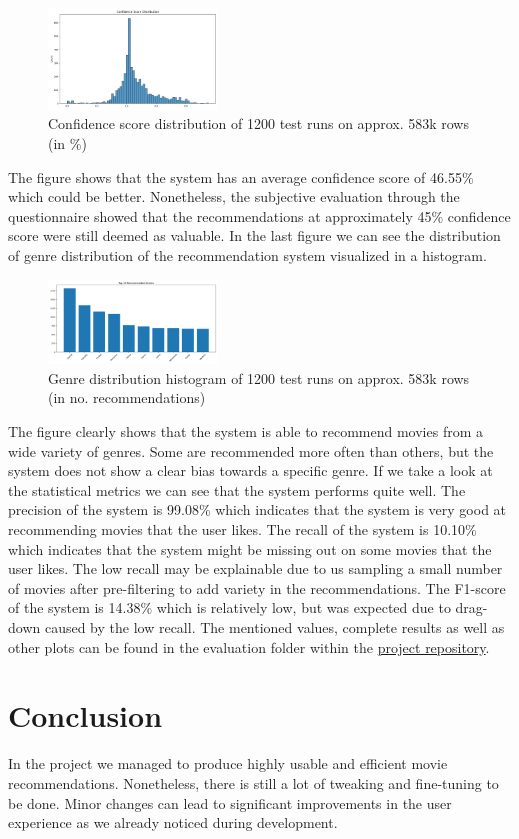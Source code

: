 \documentclass[12pt,a4paper]{article}
\begin{document}
\begin{figure}[H]
  \centering
  \includegraphics[width=0.4\textwidth]{../assets/confidence_dist.png}
  \caption{Confidence score distribution of 1200 test runs on approx. 583k rows (in \%)}
\end{figure}

\noindent The figure shows that the system has an average confidence score of 46.55\% which could be better.
Nonetheless, the subjective evaluation through the questionnaire showed that the recommendations at approximately 45\% confidence score were still deemed as valuable.
In the last figure we can see the distribution of genre distribution of the recommendation system visualized in a histogram.

\begin{figure}[H]
  \centering
  \includegraphics[width=0.4\textwidth]{../assets/top_genres.png}
  \caption{Genre distribution histogram of 1200 test runs on approx. 583k rows (in no. recommendations)}
\end{figure}

\noindent The figure clearly shows that the system is able to recommend movies from a wide variety of genres.
Some are recommended more often than others, but the system does not show a clear bias towards a specific genre.
\newline \noindent If we take a look at the statistical metrics we can see that the system performs quite well.
The precision of the system is 99.08\% which indicates that the system is very good at recommending movies that the user likes.
The recall of the system is 10.10\% which indicates that the system might be missing out on some movies that the user likes.
The low recall may be explainable due to us sampling a small number of movies after pre-filtering to add variety in the recommendations.
The F1-score of the system is 14.38\% which is relatively low, but was expected due to drag-down caused by the low recall.
\newline \noindent The mentioned values, complete results as well as other plots can be found in the evaluation folder within the \href{https://github.com/IImpaq/air-2024/evaluation}{project repository}.

\section{Conclusion}

In the project we managed to produce highly usable and efficient movie recommendations.
Nonetheless, there is still a lot of tweaking and fine-tuning to be done.
Minor changes can lead to significant improvements in the user experience as we already noticed during development.
\end{document}

